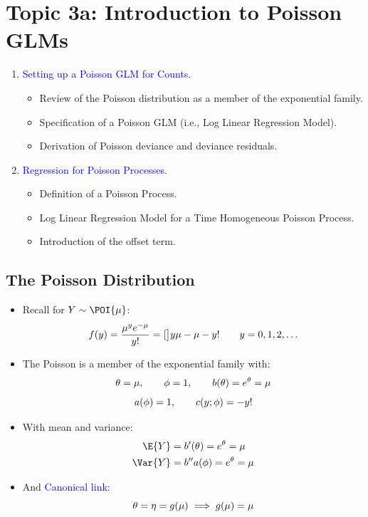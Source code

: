 \documentclass[oneside]{book}\usepackage[]{graphicx}\usepackage[svgnames]{xcolor}
\let\exp\relax%
\let\log\relax%
\begin{document}
\section*{Topic 3a: Introduction to Poisson GLMs}
\begin{enumerate}[1.]
      \item \textcolor{Blue}{Setting up a Poisson GLM for Counts}.
            \begin{itemize}
                  \item Review of the Poisson distribution as a member of the exponential family.
                  \item Specification of a Poisson GLM (i.e., Log Linear Regression Model).
                  \item Derivation of Poisson deviance and deviance residuals.
            \end{itemize}
      \item \textcolor{Blue}{Regression for Poisson Processes}.
            \begin{itemize}
                  \item Definition of a Poisson Process.
                  \item Log Linear Regression Model for a Time Homogeneous Poisson Process.
                  \item Introduction of the offset term.
            \end{itemize}
\end{enumerate}
\subsection*{The Poisson Distribution}
\begin{itemize}
      \item Recall for $ Y \sim \POI{\mu} $:
            \[ f(y)=\frac{\mu^y e^{-\mu}}{y!}=\exp[\big]{y\log{\mu}-\mu-\log{y!}}\qquad y=0,1,2,\ldots  \]
      \item The Poisson is a member of the exponential family with:
            \[ \theta=\log{\mu},\qquad \phi=1,\qquad b(\theta)=e^{\theta}=\mu \]
            \[ a(\phi)=1,\qquad c(y;\phi)=-\log{y!} \]
      \item With mean and variance:
            \begin{align*}
                  \E{Y}   & =b^\prime(\theta)=e^{\theta}=\mu        \\
                  \Var{Y} & =b^{\prime\prime}a(\phi)=e^{\theta}=\mu
            \end{align*}
      \item And \textcolor{Blue}{Canonical link}:
            \[ \theta=\eta=g(\mu)\implies g(\mu)=\log{\mu} \]
\end{itemize}
\end{document}
